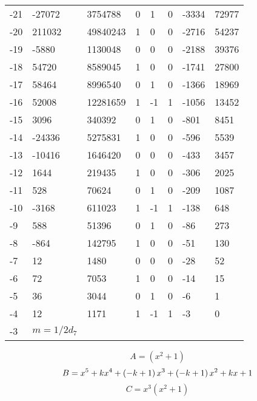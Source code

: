 \documentclass{amsart}
\begin{document}
\begin{longtable}{|l|l|l|lllll|}
-21&-27072&3754788&0&1&0&-3334&72977\\
-20&211032&49840243&1&0&0&-2716&54237\\
-19&-5880&1130048&0&0&0&-2188&39376\\
-18&54720&8589045&1&0&0&-1741&27800\\
-17&58464&8996540&0&1&0&-1366&18969\\
-16&52008&12281659&1&-1&1&-1056&13452\\
-15&3096&340392&0&1&0&-801&8451\\
-14&-24336&5275831&1&0&0&-596&5539\\
-13&-10416&1646420&0&0&0&-433&3457\\
-12&1644&219435&1&0&0&-306&2025\\
-11&528&70624&0&1&0&-209&1087\\
-10&-3168&611023&1&-1&1&-138&648\\
-9&588&51396&0&1&0&-86&273\\
-8&-864&142795&1&0&0&-51&130\\
-7&12&1480&0&0&0&-28&52\\
-6&72&7053&1&0&0&-14&15\\
-5&36&3044&0&1&0&-6&1\\
-4&12&1171&1&-1&1&-3&0\\
-3&$m=1/2d_{7}$&&\multicolumn{5}{c|}{}\\
\hline
\end{longtable}
$$A=(x^2
 + 1)$$
$$B=x^5
 + k\*x^4
 + \left(-k
 + 1\right) \*x^3
 + \left(-k
 + 1\right) \*x^2
 + k\*x
 + 1$$
$$C=x^3(x^2
 + 1)$$
\end{document}
